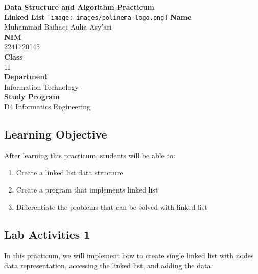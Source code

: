 \documentclass[12pt,titlepage]{article}
\newcommand{\vSubject}{Data Structure and Algorithm Practicum}
\newcommand{\vSubtitle}{Linked List}
\newcommand{\vName}{Muhammad Baihaqi Aulia Asy'ari}
\newcommand{\vNIM}{2241720145}
\newcommand{\vClass}{1I}
\newcommand{\vDepartment}{Information Technology}
\newcommand{\vStudyProgram}{D4 Informatics Engineering}
\begin{document}
\begin{titlepage}
    \centering
    \vfill
    {\bfseries\LARGE
        \vSubject\\
        \vskip0.25cm
        \vSubtitle
    }
    \vfill
    \texttt{[image: images/polinema-logo.png]}
    \vfill
    {
        \textbf{Name}\\
        \vName\\
        \vskip0.5cm
        \textbf{NIM}\\
        \vNIM\\
        \vskip0.5cm
        \textbf{Class}\\
        \vClass\\
        \vskip0.5cm
        \textbf{Department}\\
        \vDepartment\\
        \vskip0.5cm
        \textbf{Study Program}\\
        \vStudyProgram
    }
\end{titlepage}

\newpage

\setcounter{section}{1}
\subsection{Learning Objective}

After learning this practicum, students will be able to:
\begin{enumerate}
    \item Create a linked list data structure
    \item Create a program that implements linked list
    \item Differentiate the problems that can be solved with linked list
\end{enumerate}

\subsection{Lab Activities 1}
In this practicum, we will implement how to create single linked list with nodes data representation, accessing the linked list, and adding the data.
\end{document}
